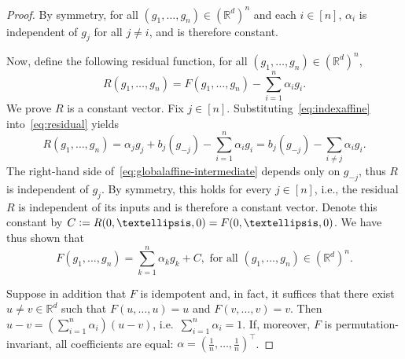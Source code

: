 \documentclass[10pt,a4paper]{amsart}
\newcommand{\R}{\mathbb{R}}
\begin{document}
\begin{proof}
    By symmetry, for all $(g_1, \ldots, g_n) \in (\R^d)^n$ and each $i \in [n]$, $\alpha_i$ is independent of $g_j$ for all $j \neq i$, and is therefore constant. 

    Now, define the following residual function, for all $(g_1, \ldots, g_n) \in (\R^d)^n$,
    \begin{equation}\label{eq:residual}
        \textstyle R(g_1, \ldots, g_n) = F(g_1, \ldots, g_n) - \sum_{i=1}^n \alpha_i g_i. 
    \end{equation}
    We prove $R$ is a constant vector.
    Fix $j\in[n]$. Substituting~\eqref{eq:indexaffine} into~\eqref{eq:residual} yields
    \begin{equation}\label{eq:globalaffine-intermediate}
        \textstyle R(g_1, \ldots, g_n) = \alpha_j g_j + b_j(g_{-j}) - \sum_{i=1}^n \alpha_i g_i = b_j(g_{-j}) - \sum_{i \neq j} \alpha_i g_i.
    \end{equation}
    The right-hand side of~\eqref{eq:globalaffine-intermediate} depends only on $g_{-j}$, thus $R$ is independent of $g_j$.
    By symmetry, this holds for every $j \in [n]$, i.e., the residual $R$ is independent of its inputs and is therefore a constant vector.
    Denote this constant by $C \vcentcolon= R(0, \ldots, 0) = F(0, \ldots, 0)$. 
    We have thus shown that
    \begin{equation*}
        \textstyle F(g_1, \ldots, g_n) = \sum_{k=1}^n \alpha_k g_k + C, \text{ for all } (g_1, \ldots, g_n) \in (\R^d)^n.
    \end{equation*}

    Suppose in addition that $F$ is idempotent and, in fact, it suffices that there exist $u \neq v \in \R^d$ such that $F(u, \ldots, u) = u$ and $F(v, \ldots, v) = v$. Then $u-v = (\sum_{i=1}^n\alpha_i) (u-v)$, i.e.\ $\sum_{i=1}^n \alpha_i = 1$. 
    If, moreover, $F$ is permutation-invariant, all coefficients are equal: $\alpha = (\frac{1}{n}, \ldots, \frac{1}{n})^\intercal$.
\end{proof}
\end{document}
